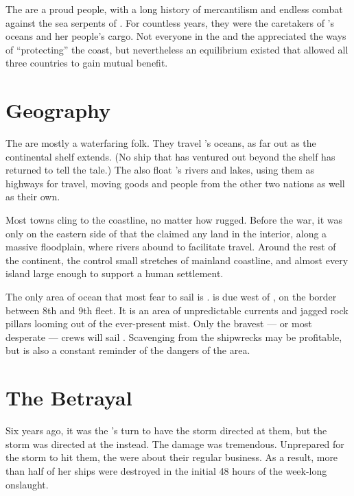 \documentclass[blue]{GL2020}
\begin{document}
\name{\bVikings{}}

The \pShippies{} are a proud people, with a long history of mercantilism and endless combat against the sea serpents of \pEarth{}. For countless years, they were the caretakers of \pEarth{}'s oceans and her people’s cargo. Not everyone in the \pFarm{} and the \pTech{} appreciated the \pShip{} ways of ``protecting'' the coast, but nevertheless an equilibrium existed that allowed all three countries to gain mutual benefit.

\section*{Geography}
The \pShip{} are mostly a waterfaring folk. They travel \pEarth{}'s oceans, as far out as the continental shelf extends. (No ship that has ventured out beyond the shelf has returned to tell the tale.) The \pShippies{} also float \pEarth{}'s rivers and lakes, using them as highways for travel, moving goods and people from the other two nations as well as their own.

Most \pShip{} towns cling to the coastline, no matter how rugged. Before the war, it was only on the eastern side of \pEarth{} that the \pShippies{} claimed any land in the interior, along a massive floodplain, where rivers abound to facilitate travel. Around the rest of the continent, the \pShip{} control small stretches of mainland coastline, and almost every island large enough to support a human settlement.

The only area of ocean that most \pShippies{} fear to sail is \pWod{}. \pWod{} is due west of \pEarth{}, on the border between 8th and 9th fleet. It is an area of unpredictable currents and jagged rock pillars looming out of the ever-present mist. Only the bravest — or most desperate — crews will sail \pWod{}. Scavenging from the shipwrecks may be profitable, but is also a constant reminder of the dangers of the area.

\section*{The Betrayal}
Six years ago, it was the \pTech{}'s turn to have the storm directed at them, but the storm was directed at the \pShip{} instead. The damage was tremendous. Unprepared for the storm to hit them, the \pShippies{} were about their regular business. As a result, more than half of her ships were destroyed in the initial 48 hours of the week-long onslaught.
\end{document}
